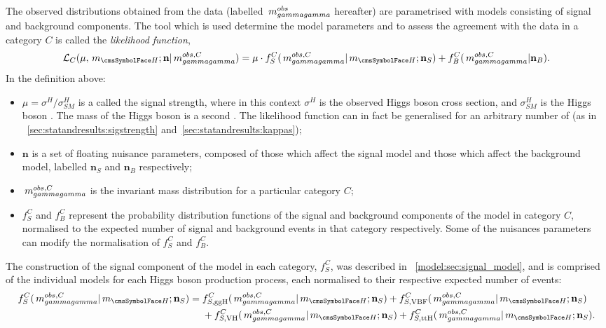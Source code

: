 The observed \mgg distributions obtained from the data (labelled $ \,m_{gammagamma}^{obs}$ hereafter) are parametrised with models consisting of signal and background components. The tool which is used determine the model parameters and to assess the agreement with the data in a category $C$ is called the \emph{likelihood function},
\begin{equation}
\label{eq:statandresults:likelihood_function}
\mathcal{L}_C(\mu, \mH; \mathbf{n} | \mgg^{obs,C} ) = \mu \cdot f^C_S(\mgg^{obs,C} |\mH ; \mathbf{n}_S) + f^C_B(\mgg^{obs,C} | \mathbf{n}_B ). 
\end{equation}
In the definition above:
\begin{itemize}
\item $\mu = \sigma^{H} / \sigma^{H}_{SM}$ is a \POI called the signal strength, where in this context $\sigma^H$ is the observed Higgs boson cross section, and $\sigma^H_{SM}$ is the \SM Higgs boson \crosssection. The mass of the Higgs boson \mH is a second \POI. The likelihood function can in fact be generalised for an arbitrary number of \POI\s (as in \Sec\s~\ref{sec:statandresults:sigstrength} and~\ref{sec:statandresults:kappas}); 
\item $\mathbf{n}$ is a set of floating nuisance parameters, composed of those which affect the signal model and those which affect the background model, labelled $\mathbf{n}_S$ and $\mathbf{n}_B$ respectively;
\item $\,m_{gammagamma}^{obs,C}$ is the invariant mass distribution for a particular category $C$;
\item $f^C_S$ and $f^C_B$ represent the probability distribution functions of the signal and background components of the model in category $C$, normalised to the expected number of signal and background events in that category respectively. Some of the nuisances parameters can modify the normalisation of $f^C_S$ and $f^C_B$. 
\end{itemize}

The construction of the signal component of the model in each category, $f^C_S$, was described in \Sec~\ref{model:sec:signal_model}, and is comprised of the individual models for each Higgs boson production process, each normalised to their respective expected number of events:
\begin{equation}
\label{eq:statandresults:f_s_breakdown}
\begin{split}
 f^C_S(\mgg^{obs,C} |\mH ; \mathbf{n}_S) ={} & f^C_{S,{\text{ggH}}}(\mgg^{obs,C} |\mH ; \mathbf{n}_S)  + f^C_{S,{\text{VBF}}}(\mgg^{obs,C} |\mH ; \mathbf{n}_S)\\
  & + f^C_{S,{\text{VH}}}(\mgg^{obs,C} |\mH ; \mathbf{n}_S)+ f^C_{S,{\text{ttH}}}(\mgg^{obs,C} |\mH ; \mathbf{n}_S).\\
\end{split}
\end{equation}

